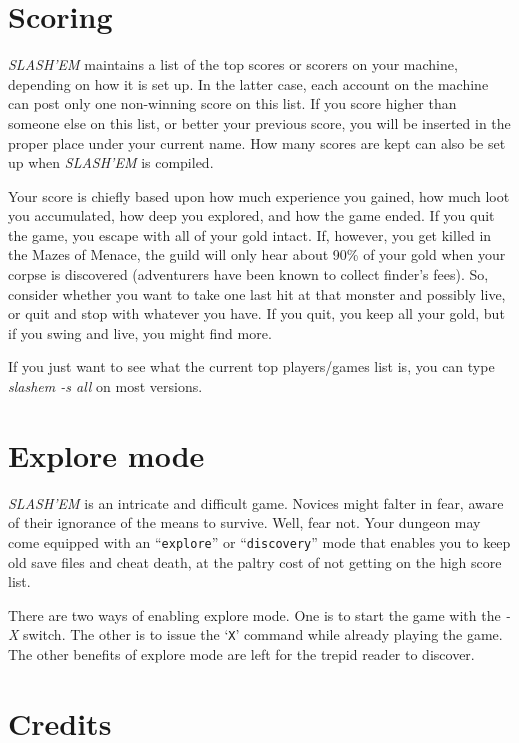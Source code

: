 \section{Scoring}


{\it SLASH'EM\/} maintains a list of the top scores or scorers on your machine,
depending on how it is set up.  In the latter case, each account on
the machine can post only one non-winning score on this list.  If
you score higher than someone else on this list, or better your
previous score, you will be inserted in the proper place under your
current name.  How many scores are kept can also be set up when
{\it SLASH'EM\/} is compiled.

Your score is chiefly based upon how much experience you gained, how
much loot you accumulated, how deep you explored, and how the game
ended.  If you quit the game, you escape with all of your gold intact.
If, however, you get killed in the Mazes of Menace, the guild will
only hear about 90\% of your gold when your corpse is discovered
(adventurers have been known to collect finder's fees).  So, consider
whether you want to take one last hit at that monster and possibly
live, or quit and stop with whatever you have.  If you quit, you keep
all your gold, but if you swing and live, you might find more.

If you just want to see what the current top players/games list is, you
can type {\it slashem -s all\/} on most versions.

\section{Explore mode}


{\it SLASH'EM\/} is an intricate and difficult game.  Novices might falter
in fear, aware of their ignorance of the means to survive.  Well, fear
not.  Your dungeon may come equipped with an ``{\tt explore}'' or ``{\tt discovery}''
mode that enables you to keep old save files and cheat death, at the
paltry cost of not getting on the high score list.

There are two ways of enabling explore mode.  One is to start the game
with the
{\it -X\/} 
switch.  The other is to issue the `{\tt X}' command while already playing
the game.  The other benefits of explore mode are left for the trepid
reader to discover.

\section{Credits}

